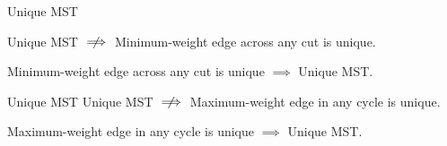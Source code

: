\begin{frame}{}
  \begin{exampleblock}{Unique MST}
    \centerline{Unique MST $\centernot\implies$ Minimum-weight edge across any cut is unique.}
  \end{exampleblock}

  \pause

  \pause
  \begin{theorem}
    \centerline{Minimum-weight edge across any cut is unique $\implies$ Unique MST.}
  \end{theorem}
\end{frame}

\begin{frame}{}
  \begin{exampleblock}{Unique MST}
    Unique MST $\centernot\implies$ Maximum-weight edge in any cycle is unique.
  \end{exampleblock}

  \pause

  \pause
  \begin{theorem}
    \centerline{Maximum-weight edge in any cycle is unique $\implies$ Unique MST.}
  \end{theorem}

\end{frame}

% 

% 
% 
% 
% 

